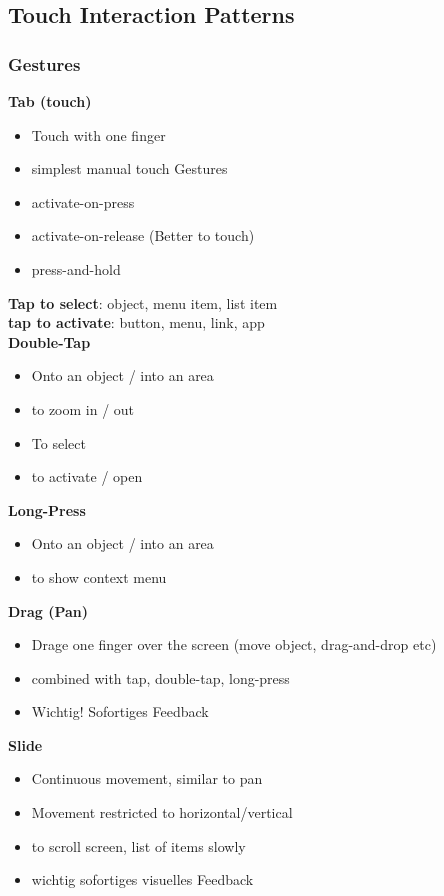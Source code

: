 \documentclass{report}
\theoremstyle{definition}
\theoremstyle{example}
\begin{document}
\subsection{Touch Interaction Patterns}

\subsubsection{Gestures}
\textbf{Tab (touch)}
\begin{itemize}
   \item Touch with one finger
   \item simplest manual touch Gestures
   \item activate-on-press 
   \item activate-on-release (Better to touch) 
   \item press-and-hold
\end{itemize}

\textbf{Tap to select}: object, menu item, list item\\
\textbf{tap to activate}: button, menu, link, app\\

\textbf{Double-Tap}
\begin{itemize}
   \item Onto an object / into an area 
   \item to zoom in / out 
   \item To select 
   \item to activate / open
\end{itemize}

\textbf{Long-Press}
\begin{itemize}
   \item Onto an object / into an area 
   \item to show context menu 
\end{itemize}

\textbf{Drag (Pan)}
\begin{itemize}
   \item Drage one finger over the screen (move object, drag-and-drop etc)
   \item combined with tap, double-tap, long-press
   \item Wichtig! Sofortiges Feedback
\end{itemize}

\textbf{Slide}
\begin{itemize}
   \item Continuous movement, similar to pan
   \item Movement restricted to horizontal/vertical
   \item to scroll screen, list of items slowly
   \item wichtig sofortiges visuelles Feedback
\end{itemize}
\end{document}
